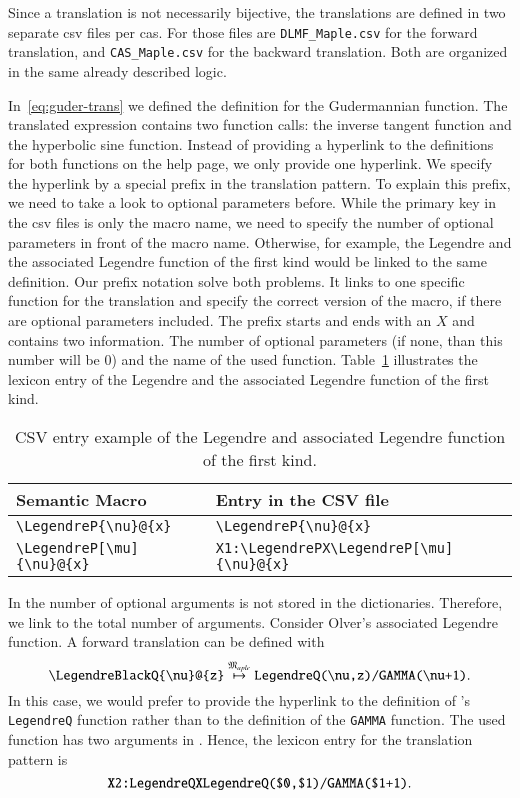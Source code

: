 Since a translation is not necessarily bijective, the translations are defined in two separate \gls{csv} files per \gls{cas}. For \Maple{} those files are \verb|DLMF_Maple.csv| for the forward translation, and \verb|CAS_Maple.csv| for the backward translation. Both are organized in the same already described logic.

In~\ref{eq:guder-trans} we defined the definition for the Gudermannian function. The translated expression contains two function calls: the inverse tangent function and the hyperbolic sine function. Instead of providing a hyperlink to the definitions for both functions on the \Maple{} help page, we only provide one hyperlink. We specify the hyperlink by a special prefix in the translation pattern. To explain this prefix, we need to take a look to optional parameters before. While the primary key in the \gls{csv} files is only the macro name, we need to specify the number of optional parameters in front of the macro name. Otherwise, for example, the Legendre and the associated Legendre function of the first kind would be linked to the same definition. Our prefix notation solve both problems. It links to one specific function for the translation and specify the correct version of the macro, if there are optional parameters included. The prefix starts and ends with an $X$ and contains two information. The number of optional parameters (if none, than this number will be $0$) and the name of the used function. Table~\ref{tab:legendreP-lex} illustrates the lexicon entry of the Legendre and the associated Legendre function of the first kind.

\begin{table}
	\centering
	\begin{tabular}{ll}
		\hline
		Semantic Macro & Entry in the CSV file\\
		\hline
		\verb|\LegendreP{\nu}@{x}| & \verb|\LegendreP{\nu}@{x}| \\
		\verb|\LegendreP[\mu]{\nu}@{x}| & \verb|X1:\LegendrePX\LegendreP[\mu]{\nu}@{x}|\\
		\hline
	\end{tabular}
	\caption{CSV entry example of the Legendre and associated Legendre function of the first kind.}
	\label{tab:legendreP-lex}
\end{table}

In \Maple{} the number of optional arguments is not stored in the dictionaries. Therefore, we link to the total number of arguments. Consider Olver's associated Legendre function. A forward translation can be defined with 
\begin{equation}
\verb|\LegendreBlackQ{\nu}@{z}| \overset{\langMaple}{\mapsto} \verb|LegendreQ(\nu,z)/GAMMA(\nu+1)|.
\end{equation}
In this case, we would prefer to provide the hyperlink to the definition of \Maple's \verb|LegendreQ| function rather than to the definition of the \verb|GAMMA| function. The used function has two arguments in \Maple. Hence, the lexicon entry for the translation pattern is
\begin{equation}
\verb|X2:LegendreQXLegendreQ($0,$1)/GAMMA($1+1)|.
\end{equation}

